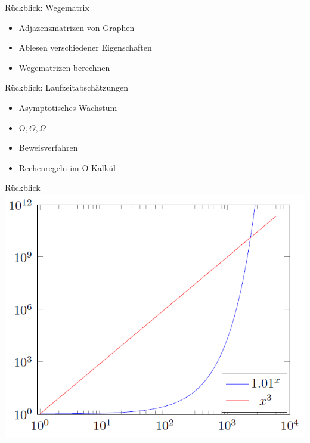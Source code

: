 

\newcommand{\mydate}{27.01.2017}

\newcommand{\handout}{}



\graphicspath{{../figures/}}




\framePrevEpisode

\begin{frame}{Rückblick: Wegematrix}
	\begin{itemize}[<+->]
		\item Adjazenzmatrizen von Graphen
		\item Ablesen verschiedener Eigenschaften
		\item Wegematrizen berechnen
	\end{itemize}
\end{frame}

\begin{frame}{Rückblick: Laufzeitabschätzungen}
	\begin{itemize}[<+->]
		\item Asymptotisches Wachstum
		\item O$, \Theta, \Omega$
		\item Beweisverfahren
		\item Rechenregeln im O-Kalkül
	\end{itemize}
\end{frame}

\begin{frame}{Rückblick}
	\centering
	\includegraphics[scale=0.5]{laufzeit/polyVsExp}
\end{frame}

